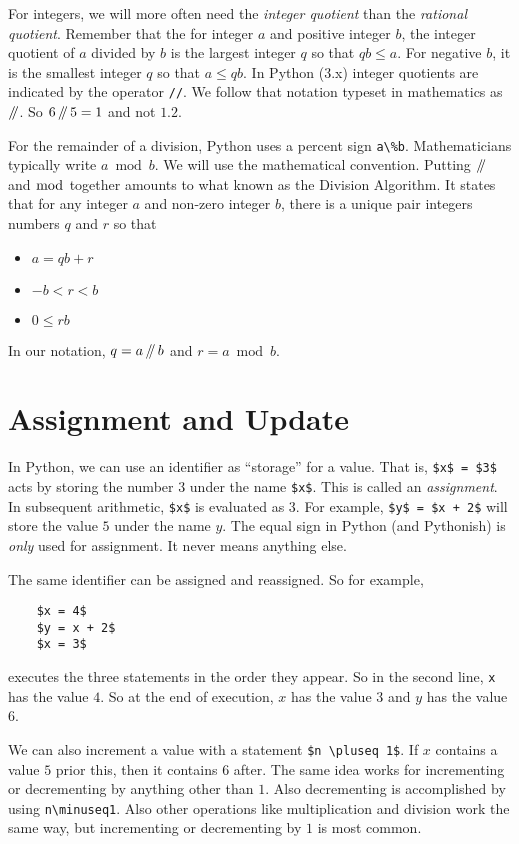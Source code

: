 For integers, we will more often need the \emph{integer quotient} than the \emph{rational quotient}. Remember that the for integer $a$ and positive integer $b$, the integer quotient of 
$a$ divided by $b$ is the largest integer $q$ so that $qb\leq a$. For negative $b$, it is the smallest integer $q$ so that $a\leq qb$. In Python (3.x) integer quotients are indicated by the operator \lstinline|//|. We follow that notation typeset in mathematics as $\mathop{/\mkern-5mu/}$. So $6\mathop{/\mkern-5mu/} 5 = 1$ and not $1.2$. 

For the remainder of a division, Python uses a percent sign \lstinline|a\%b|. Mathematicians typically write $a \bmod b$. We will use the mathematical convention. Putting $\mathop{/\mkern-5mu/}$ and $\bmod$ together amounts to what known as the Division Algorithm. It states that for any integer $a$ and non-zero integer $b$, there is a unique pair integers numbers $q$ and $r$ so that 
\begin{itemize}
	\item $a = qb + r$
	\item $-b < r < b$
	\item $0\leq rb$
\end{itemize}
In our notation, $q = a\mathop{/\mkern-5mu/} b$ and $r = a\bmod b$.

\section{Assignment and Update}

In Python, we can use an identifier as ``storage'' for a value. 
That is, \lstinline|$x$ = $3$| acts by storing the number $3$ under the
name \lstinline|$x$|. 
This is called an \emph{assignment}. 
In subsequent arithmetic, \lstinline|$x$| is evaluated as $3$. 
For example, \lstinline|$y$ = $x + 2$| will store the value $5$ under the name $y$.
The equal sign in Python (and Pythonish) is \emph{only} used for assignment. 
It never means anything else.

The same identifier can be assigned and reassigned. 
So for example,
\begin{code}
	\begin{lstlisting}
	$x = 4$ 
	$y = x + 2$ 
	$x = 3$
	\end{lstlisting}
\end{code}
executes the three statements in the order they appear. 
So in the second line, \lstinline|x| has the value $4$.
So at the end of execution, $x$ has the value $3$ and $y$ has the value $6$.

We can also increment a value with a statement
\lstinline|$n \pluseq 1$|.
If $x$ contains a value $5$ prior this, then it contains $6$ after.
The same idea works for incrementing or decrementing by anything other than $1$.
Also decrementing is accomplished by using \lstinline|n\minuseq1|.
Also other operations like multiplication and division work the same way, but incrementing or decrementing by $1$ is most common.

